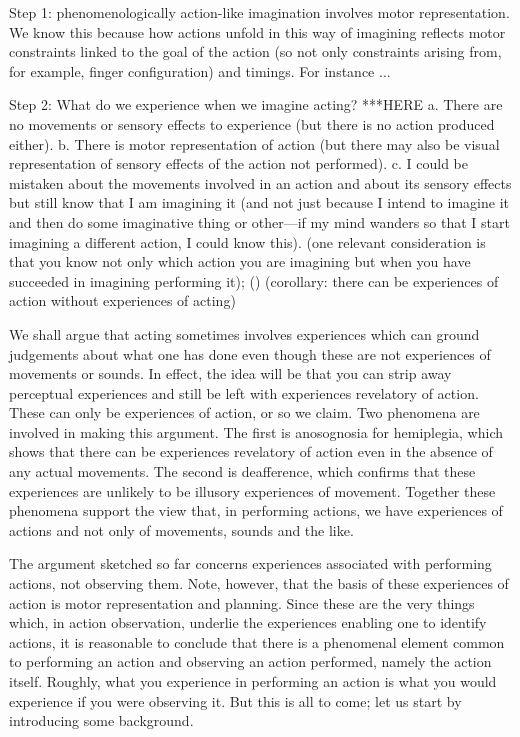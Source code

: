 \documentclass[12pt,\papersize]{extarticle}
\begin{document}
Step 1: phenomenologically action-like imagination involves motor representation.  We know this because how actions unfold in this way of imagining reflects motor constraints linked to the goal of the action (so not only constraints arising from, for example, finger configuration) and timings.  For instance ...

Step 2: What do we experience when we imagine acting?  ***HERE
a.  There are no movements or sensory effects to experience (but there is  no action produced either).
b.  There is motor representation of action (but there may also be visual representation of sensory effects of the action not performed).
c.  I could be mistaken about the movements involved in an action and about its sensory effects but still know that I am imagining it (and not just because I intend to imagine it and then do some imaginative thing or other---if my mind wanders so that I start imagining a different action, I could know this).
(one relevant consideration is that you know not only which action you are imagining but when you have succeeded in imagining performing it); ()
(corollary: there can be experiences of action without experiences of acting)




We shall argue that acting sometimes involves experiences which can ground judgements about what one has done even though these are not experiences of movements or sounds.  In effect, the idea will be that you can strip away perceptual experiences and still be left with experiences revelatory of action.  These can only be experiences of action, or so we claim.  Two phenomena are involved in making this argument.  The first is anosognosia for hemiplegia, which shows that there can be experiences revelatory of action even in the absence of any actual movements.  The second is deafference, which confirms that these experiences are unlikely to be illusory experiences of movement. Together these phenomena support the view that, in performing actions, we have experiences of actions and not only of movements, sounds and the like.  

The argument sketched so far concerns experiences associated with performing actions, not observing them.  Note, however, that the basis of these experiences of action is motor representation and planning.  Since these are the very things which, in action observation, underlie the experiences enabling one to identify actions, it is reasonable to conclude that there is a phenomenal element common to performing an action and observing an action performed, namely the action itself.  Roughly, what you experience in performing an action is what you would experience if you were observing it.  But this is all to come; let us start by introducing some background. 
\end{document}
